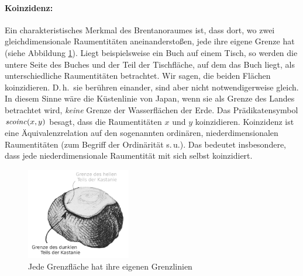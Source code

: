     \paragraph{Koinzidenz:}
       Ein
       charakteristisches Merkmal des Brentanoraumes ist, dass dort, wo zwei gleichdimensionale Raumentitäten aneinanderstoßen, jede ihre eigene Grenze hat (siehe Abbildung \ref{fig:kastanie}).
       Liegt beispielsweise ein Buch auf einem Tisch, so werden die untere Seite des Buches und der Teil der Tischfläche, auf dem das Buch liegt, als unterschiedliche Raumentitäten betrachtet. 
       Wir sagen, die beiden Flächen %
       koinzidieren. 
       D.\,h.\ sie berühren einander, sind aber nicht notwendigerweise gleich. 
       In diesem Sinne wäre die Küstenlinie von Japan, wenn sie als Grenze des Landes betrachtet wird, \emph{keine} Grenze der Wasserflächen der Erde.
       Das Prädikatensymbol $\mathit{scoinc}(x,y)$ besagt, dass die Raumentitäten $x$ und $y$ koinzidieren.
       Koinzidenz ist eine Äquivalenzrelation auf den sogenannten ordinären, niederdimensionalen Raumentitäten (zum Begriff der Ordinärität s.\,u.). 
       Das bedeutet insbesondere, dass jede niederdimensionale Raumentität mit sich selbst koinzidiert.
           
        \begin{figure}[ht]
            \centering
            \includegraphics[height=4cm]{abb/kastanie.png}
            \caption{Jede Grenzfläche hat ihre eigenen Grenzlinien}
            \label{fig:kastanie}
        \end{figure}
        
       
